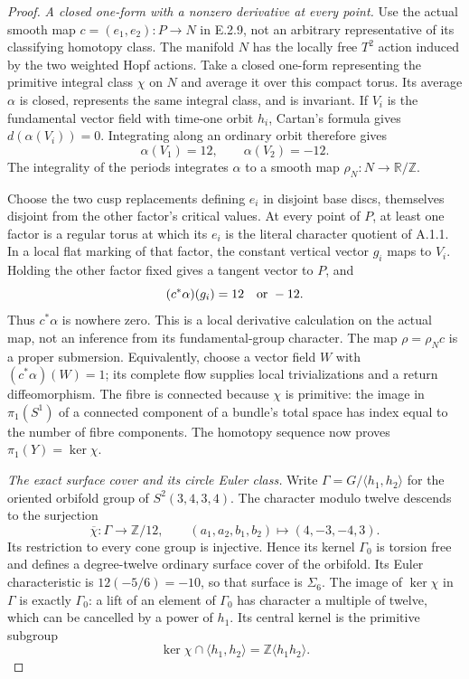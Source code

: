 \begin{proof}
\emph{A closed one-form with a nonzero derivative at every point.}
Use the actual smooth map $c=(e_1,e_2):P\to N$ in E.2.9,
not an arbitrary representative of its classifying homotopy
class. The manifold $N$ has the locally free $T^2$ action
induced by the two weighted Hopf actions. Take a closed
one-form representing the primitive integral class $\chi$
on $N$ and average it over this compact torus. Its average
$\alpha$ is closed, represents the same integral class,
and is invariant. If $V_i$ is the fundamental vector field
with time-one orbit $h_i$, Cartan's formula gives
$d(\alpha(V_i))=0$. Integrating along an ordinary orbit
therefore gives
\[
                  \alpha(V_1)=12,\qquad \alpha(V_2)=-12.
 \tag{E.S25}
\]
The integrality of the periods integrates $\alpha$ to a
smooth map $\rho_N:N\to\mathbb R/\mathbb Z$.

Choose the two cusp replacements defining $e_i$ in disjoint
base discs, themselves disjoint from the other factor's
critical values. At every point of $P$, at least one factor
is a regular torus at which its $e_i$ is the literal character
quotient of A.1.1. In a local flat marking of that factor,
the constant vertical vector $g_i$ maps to $V_i$. Holding
the other factor fixed gives a tangent vector to $P$, and
\[
                     (c^*\alpha)(g_i)=12\quad\hbox{or }-12.
\]
Thus $c^*\alpha$ is nowhere zero. This is a local derivative
calculation on the actual map, not an inference from its
fundamental-group character. The map $\rho=\rho_Nc$ is a
proper submersion. Equivalently, choose a vector field $W$
with $(c^*\alpha)(W)=1$; its complete flow supplies local
trivializations and a return diffeomorphism. The fibre is
connected because $\chi$ is primitive: the image in
$\pi_1(S^1)$ of a connected component of a bundle's total
space has index equal to the number of fibre components.
The homotopy sequence now proves $\pi_1(Y)=\ker\chi$.

\emph{The exact surface cover and its circle Euler class.}
Write $\Gamma=G/\langle h_1,h_2\rangle$ for the oriented
orbifold group of $S^2(3,4,3,4)$. The character modulo
twelve descends to the surjection
\[
 \overline\chi:\Gamma\longrightarrow\mathbb Z/12,
       \qquad(a_1,a_2,b_1,b_2)\longmapsto(4,-3,-4,3).
 \tag{E.S26}
\]
Its restriction to every cone group is injective. Hence its
kernel $\Gamma_0$ is torsion free and defines a degree-twelve
ordinary surface cover of the orbifold. Its Euler characteristic
is $12(-5/6)=-10$, so that surface is $\Sigma_6$. The image
of $\ker\chi$ in $\Gamma$ is exactly $\Gamma_0$: a lift of
an element of $\Gamma_0$ has character a multiple of twelve,
which can be cancelled by a power of $h_1$. Its central
kernel is the primitive subgroup
\[
 \ker\chi\cap\langle h_1,h_2\rangle
                =\mathbb Z\langle h_1h_2\rangle.
 \tag{E.S27}
\]


\end{proof}

